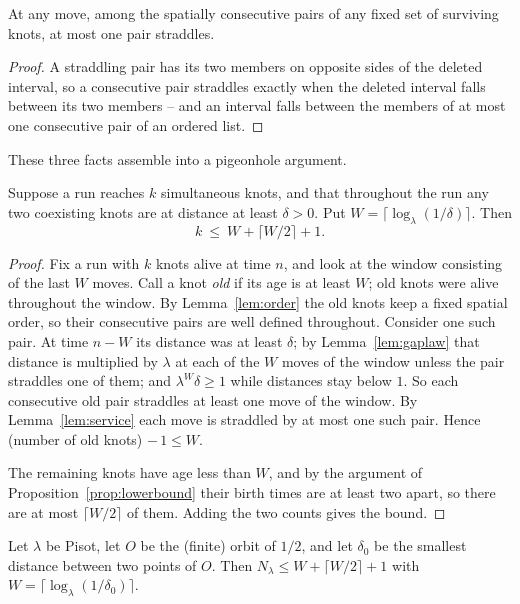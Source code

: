 \begin{lemma}\label{lem:service}
At any move, among the spatially consecutive pairs of any fixed set of
surviving knots, at most one pair straddles.
\end{lemma}

\begin{proof}
A straddling pair has its two members on opposite sides of the deleted
interval, so a consecutive pair straddles exactly when the deleted interval
falls between its two members -- and an interval falls between the members of
at most one consecutive pair of an ordered list.
\end{proof}

These three facts assemble into a pigeonhole argument.

\begin{theorem}\label{thm:schedule}
Suppose a run reaches $k$ simultaneous knots, and that throughout the run any
two coexisting knots are at distance at least $\delta>0$. Put
$W=\lceil\log_\lambda(1/\delta)\rceil$. Then
\[
  k\ \leq\ W+\lceil W/2\rceil+1.
\]
\end{theorem}

\begin{proof}
Fix a run with $k$ knots alive at time $n$, and look at the window consisting
of the last $W$ moves. Call a knot \emph{old} if its age is at least $W$; old
knots were alive throughout the window. By Lemma~\ref{lem:order} the old
knots keep a fixed spatial order, so their consecutive pairs are well defined
throughout. Consider one such pair. At time $n-W$ its distance was at least
$\delta$; by Lemma~\ref{lem:gaplaw} that distance is multiplied by $\lambda$
at each of the $W$ moves of the window unless the pair straddles one of them;
and $\lambda^W\delta\geq1$ while distances stay below $1$. So each
consecutive old pair straddles at least one move of the window. By
Lemma~\ref{lem:service} each move is straddled by at most one such pair.
Hence (number of old knots) $-\,1\leq W$.

The remaining knots have age less than $W$, and by the argument of
Proposition~\ref{prop:lowerbound} their birth times are at least two apart, so
there are at most $\lceil W/2\rceil$ of them. Adding the two counts gives the
bound.
\end{proof}

\begin{corollary}\label{cor:effective}
Let $\lambda$ be Pisot, let $O$ be the (finite) orbit of $1/2$, and let
$\delta_0$ be the smallest distance between two points of $O$. Then
$N_\lambda\leq W+\lceil W/2\rceil+1$ with
$W=\lceil\log_\lambda(1/\delta_0)\rceil$.
\end{corollary}

